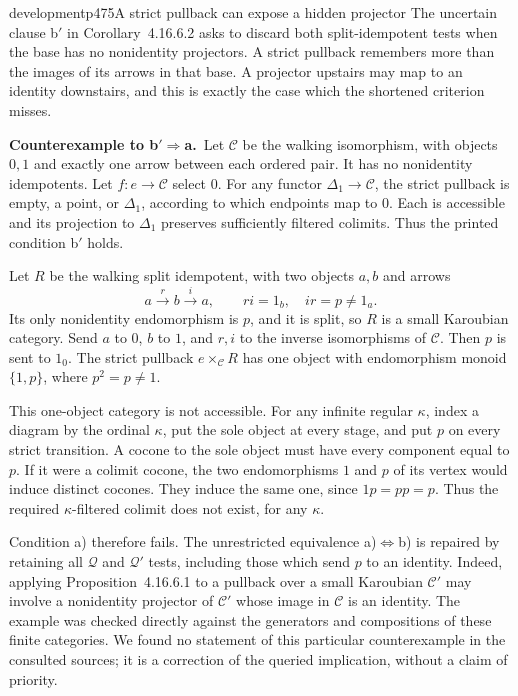 \begin{dcomment}{development}{p475}{A strict pullback can expose a hidden projector}
The uncertain clause b$'$ in Corollary~4.16.6.2 asks to discard both split-idempotent tests when the base has no nonidentity projectors. A strict pullback remembers more than the images of its arrows in that base. A projector upstairs may map to an identity downstairs, and this is exactly the case which the shortened criterion misses.

\textbf{Counterexample to b$'\Rightarrow$a.}\ours\
Let $\mathcal C$ be the walking isomorphism, with objects $0,1$ and exactly one arrow between each ordered pair. It has no nonidentity idempotents. Let $f:e\to\mathcal C$ select $0$. For any functor $\Delta_1\to\mathcal C$, the strict pullback is empty, a point, or $\Delta_1$, according to which endpoints map to $0$. Each is accessible and its projection to $\Delta_1$ preserves sufficiently filtered colimits. Thus the printed condition b$'$ holds.

Let $R$ be the walking split idempotent, with two objects $a,b$ and arrows
\[
 a\xrightarrow{r}b\xrightarrow{i}a,
 \qquad ri=1_b,\quad ir=p\ne1_a.
\]
Its only nonidentity endomorphism is $p$, and it is split, so $R$ is a small Karoubian category. Send $a$ to $0$, $b$ to $1$, and $r,i$ to the inverse isomorphisms of $\mathcal C$. Then $p$ is sent to $1_0$. The strict pullback $e\times_{\mathcal C}R$ has one object with endomorphism monoid $\{1,p\}$, where $p^2=p\ne1$.

This one-object category is not accessible. For any infinite regular $\kappa$, index a diagram by the ordinal $\kappa$, put the sole object at every stage, and put $p$ on every strict transition. A cocone to the sole object must have every component equal to $p$. If it were a colimit cocone, the two endomorphisms $1$ and $p$ of its vertex would induce distinct cocones. They induce the same one, since $1p=pp=p$. Thus the required $\kappa$-filtered colimit does not exist, for any $\kappa$.

Condition a) therefore fails. The unrestricted equivalence a)$\Leftrightarrow$b) is repaired by retaining all $\mathcal Q$ and $\mathcal Q'$ tests, including those which send $p$ to an identity. Indeed, applying Proposition~4.16.6.1 to a pullback over a small Karoubian $\mathcal C'$ may involve a nonidentity projector of $\mathcal C'$ whose image in $\mathcal C$ is an identity. The example was checked directly against the generators and compositions of these finite categories. We found no statement of this particular counterexample in the consulted sources; it is a correction of the queried implication, without a claim of priority.
\end{dcomment}



